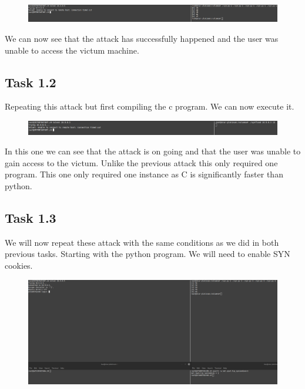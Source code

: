 \documentclass[12pt]{article}
\begin{document}
\begin{figure}[!ht]
  \includegraphics*{Task1.1Attempt2Attack.png}
\end{figure}

We can now see that the attack has successfully happened and the user was unable to access the victum machine.

\subsection*{Task 1.2}

Repeating this attack but first compiling the c program. We can now execute it.\\

\begin{figure}[!ht]
  \includegraphics*{Task1.2Fail.png}
\end{figure}

In this one we can see that the attack is on going and that the user was unable to gain access to the victum. Unlike the previous 
attack this only required one program. This one only required one instance as C is significantly faster than python.


\subsection*{Task 1.3}

We will now repeat these attack with the same conditions as we did in both previous tasks. Starting with the 
python program. We will need to enable SYN cookies.\\

\begin{figure}[!ht]
  \includegraphics*{1.3pythonCookies.png}
\end{figure}
\end{document}
